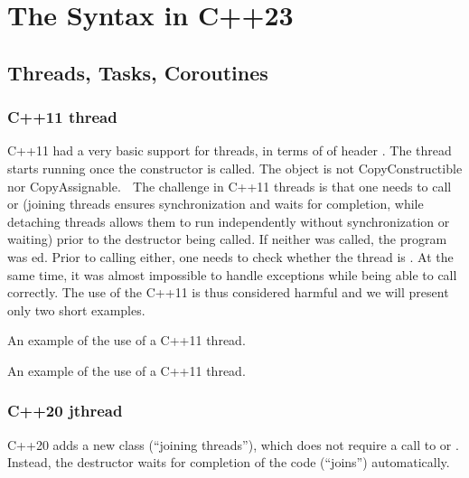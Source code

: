 \chapter{The Syntax in C++23}

\section{Threads, Tasks, Coroutines}

\subsection{C++11 thread}

C++11 had a very basic support for threads, in terms of  of header . The thread starts running once the constructor is called. The object is not CopyConstructible nor CopyAssignable. 
The challenge in C++11 threads is that one needs to call  or  (joining threads ensures synchronization and waits for completion, while detaching threads allows them to run independently without synchronization or waiting) prior to the destructor being called. If neither was called, the program was ed. 
Prior to calling either, one needs to check whether the thread is .
At the same time, it was almost impossible to handle exceptions while being able to call  correctly. 
The use of the C++11  is thus considered harmful and we will present only two short examples.

\raggedbottom
\begin{codebox}[]{\href{https://godbolt.org/z/nqdn4YvEM}{\ExternalLink}}
\footnotesize An example of the use of a C++11 thread.
\tcblower
{}
\end{codebox}

\raggedbottom
\begin{codebox}[]{\href{https://godbolt.org/z/1Gbf4Wo75}{\ExternalLink}}
\footnotesize An example of the use of a C++11 thread.
\tcblower
{}
\end{codebox}

\subsection{C++20 jthread}

C++20 adds a new class  (``joining threads''), which does not require a call to  or . Instead, the destructor waits for completion of the code (``joins'') automatically. 

